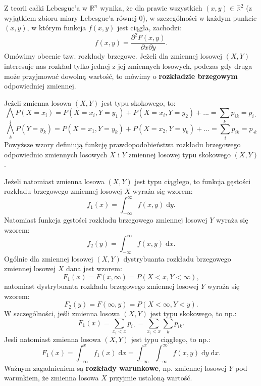 \documentclass[10pt,a4paper]{article}
\newcommand{\dd}{\; \mathrm{d}}
\begin{document}
Z teorii całki Lebesgue'a w $\mathbb{R}^n$ wynika, że dla prawie wszystkich $(x,y)\in\mathbb{R}^2$ (z wyjątkiem zbioru miary Lebesgue'a równej 0), w szczególności w każdym
 punkcie $(x,y)$, w którym funkcja $f(x,y)$ jest ciągła, zachodzi:
\begin{equation}
f(x,y)=\frac{\partial^2F(x,y)}{\partial x\partial y}.
\end{equation}
Omówimy obecnie tzw. rozkłady brzegowe. Jeżeli dla zmiennej losowej $(X,Y)$ interesuje nas rozkład tylko jednej z jej zmiennych losowych, podczas gdy druga może przyjmować
dowolną wartość, to mówimy o \textbf{rozkładzie brzegowym} odpowiedniej zmiennej.

Jeżeli zmienna losowa $(X,Y)$ jest typu skokowego, to:
\[\bigwedge_iP(X=x_i)=P(X=x_i,Y=y_1)+P(X=x_i,Y=y_2)+... = \sum_kp_{ik}=p_{i\cdot}\]
\[\bigwedge_kP(Y=y_k)=P(X=x_1,Y=y_k)+P(X=x_2,Y=y_k)+... = \sum_ip_{ik}=p_{\cdot k}\]
Powyższe wzory definiują funkcję prawdopodobieństwa rozkładu brzegowego odpowiednio zmiennych losowych $X$ i $Y$ zmiennej losowej typu
skokowego $(X,Y)$.

Jeżeli natomiast zmienna losowa $(X,Y)$ jest typu ciągłego, to funkcja gęstości rozkładu brzegowego zmiennej losowej $X$ wyraża się wzorem:
\[f_1(x) = \int_{-\infty}^{\infty}f(x,y)\dd{y}.\]
Natomiast funkcja gęstości rozkładu brzegowego zmiennej losowej $Y$ wyraża się wzorem:
\[f_2(y) = \int_{-\infty}^{\infty}f(x,y)\dd{x}.\]
Ogólnie dla zmiennej losowej $(X,Y)$ dystrybuanta rozkładu brzegowego zmiennej losowej $X$ dana jest wzorem:
\[F_1(x) = F(x,\infty) = P(X<x,Y<\infty),\]
natomiast dystrybuanta rozkładu brzegowego zmiennej losowej $Y$ wyraża się wzorem:
\[F_2(y) = F(\infty,y) = P(X<\infty,Y<y).\]
W szczególności, jeśli zmienna losowa $(X,Y)$ jest typu skokowego, to np.:
\[F_1(x) = \sum_{x_i<x}p_{i\cdot}=\sum_{x_i<x}\sum_kp_{ik}.\]
Jesli natomiast zmienna losowa $(X,Y)$ jest typu ciągłego, to np.:
\[F_1(x) = \int_{-\infty}^xf_1(x)\dd{x} = \int_{-\infty}^x\int_{-\infty}^{\infty}f(x,y)\dd{y}\dd{x}.\]
Ważnym zagadnieniem są \textbf{rozkłady warunkowe}, np. zmiennej losowej $Y$ pod warunkiem, że zmienna losowa $X$ przyjmie ustaloną wartość. 
\end{document}
